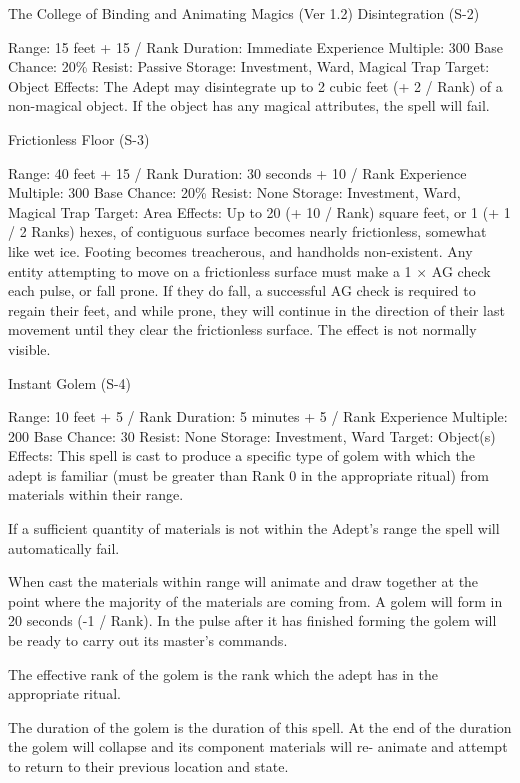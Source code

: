 \begin{Chapter}{The College of Binding and Animating Magics (Ver 1.2)}
Disintegration (S-2) 

Range: 15 feet + 15 / Rank 
Duration: Immediate 
Experience Multiple: 300 
Base Chance: 20\% 
Resist: Passive 
Storage: Investment, Ward, Magical Trap 
Target: Object 
Effects:  The  Adept  may  disintegrate  up to  2  cubic 
feet  (+  2  /  Rank)  of  a  non-magical  object.  If  the 
object has any magical attributes, the spell will fail. 

Frictionless Floor (S-3) 

Range: 40 feet + 15 / Rank 
Duration: 30 seconds + 10 / Rank 
Experience Multiple: 300 
Base Chance: 20\% 
Resist: None 
Storage: Investment, Ward, Magical Trap 
Target: Area 
Effects: Up to 20 (+ 10 / Rank) square feet, or 1 (+ 
1 / 2 Ranks) hexes, of contiguous surface becomes 
nearly frictionless, somewhat like wet ice. Footing 
becomes  treacherous,  and  handholds  non-existent. 
Any  entity  attempting  to  move  on  a  frictionless 
surface must make a 1 × AG check each pulse, or 
fall prone. If they do fall, a successful AG check is 
required to regain their feet, and while prone, they 
will  continue  in  the  direction  of  their  last  movement  until  they  clear  the  frictionless  surface.  The 
effect is not normally visible. 

Instant Golem (S-4) 

Range: 10 feet + 5 / Rank 
Duration: 5 minutes + 5 / Rank 
Experience Multiple: 200 
Base Chance: 30%
Resist: None 
Storage: Investment, Ward 
Target: Object(s) 
Effects: This spell is cast to produce a specific type 
of golem with which the adept is familiar (must be 
greater than Rank 0 in the appropriate ritual) from 
materials within their range. 

If a sufficient quantity of materials is not within the 
Adept’s range the spell will automatically fail. 

When cast the materials within range will animate 
and  draw  together  at  the  point  where  the  majority 
of  the  materials  are  coming  from.  A  golem  will 
form in 20 seconds (-1 / Rank). In the pulse after it 
has  finished  forming  the  golem  will  be  ready  to 
carry out its master’s commands. 

The  effective  rank  of  the  golem  is  the  rank  which 
the adept has in the appropriate ritual. 

The  duration  of  the  golem  is  the  duration  of  this 
spell.  At  the  end  of  the  duration  the  golem  will 
collapse  and  its  component  materials  will  re-
animate  and  attempt  to  return  to  their  previous 
location and state. 


\end{Chapter}
